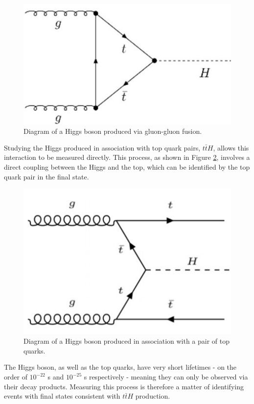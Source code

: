 \begin{figure}[H]
\centering                                                                                                                
   \includegraphics[width=0.5\linewidth]{figures/theory/Hgg.JPG}
\caption{Diagram of a Higgs boson produced via gluon-gluon fusion.}
\label{fig:Hgg}
\end{figure}

Studying the Higgs produced in association with top quark pairs, $t\bar{t}H$, allows this interaction to be measured directly. This process, as shown in Figure \ref{fig:ttH_diagram}, involves a direct coupling between the Higgs and the top, which can be identified by the top quark pair in the final state.

\begin{figure}[H]
\centering
   \includegraphics[width=0.6\linewidth]{figures/theory/ttH_diagram.JPG}
\caption{Diagram of a Higgs boson produced in association with a pair of top quarks.}                         
\label{fig:ttH_diagram}                                                                                    
\end{figure}

The Higgs boson, as well as the top quarks, have very short lifetimes - on the order of $10^{-22}$ s and $10^{-25}$ s respectively - meaning they can only be observed via their decay products. Measuring this process is therefore a matter of identifying events with final states consistent with $t\bar{t}H$ production. 

